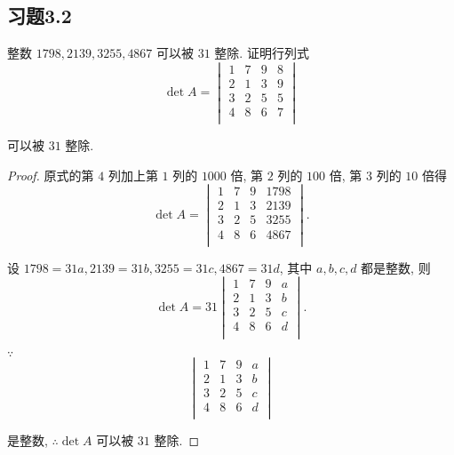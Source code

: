 \documentclass[color=black,device=normal,lang=cn,mode=geye]{elegantnote}
\begin{document}
\subsection{习题3.2}
\begin{exercise}%
    整数 $1798,2139,3255,4867$ 可以被 $31$ 整除. 证明行列式
    \[\det A=\begin{vmatrix}
        1 & 7 & 9 & 8 \\
        2 & 1 & 3 & 9 \\
        3 & 2 & 5 & 5 \\
        4 & 8 & 6 & 7 \\
    \end{vmatrix}\]

    可以被 $31$ 整除.
\end{exercise}
\begin{proof}
    原式的第 $4$ 列加上第 $1$ 列的 $1000$ 倍, 第 $2$ 列的 $100$ 倍, 第 $3$ 列的 $10$ 倍得
    \[\det A=\begin{vmatrix}
        1 & 7 & 9 & 1798 \\
        2 & 1 & 3 & 2139 \\
        3 & 2 & 5 & 3255 \\
        4 & 8 & 6 & 4867 \\
    \end{vmatrix}.\]

    设 $1798=31a,2139=31b,3255=31c,4867=31d$, 其中 $a,b,c,d$ 都是整数, 则
    \[\det A=31\begin{vmatrix}
        1 & 7 & 9 & a \\
        2 & 1 & 3 & b \\
        3 & 2 & 5 & c \\
        4 & 8 & 6 & d \\
    \end{vmatrix}.\]

    $\because$
    \[\begin{vmatrix}
        1 & 7 & 9 & a \\
        2 & 1 & 3 & b \\
        3 & 2 & 5 & c \\
        4 & 8 & 6 & d \\
    \end{vmatrix}\]

    是整数, $\therefore\det A$ 可以被 $31$ 整除.
\end{proof}
\end{document}

